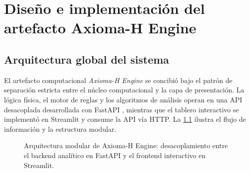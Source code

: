 \chapter{Dise\~no e implementaci\'on del artefacto Axioma-H Engine}
\label{cap:diseno_artefacto}

\section{Arquitectura global del sistema}
El artefacto computacional \emph{Axioma-H Engine} \parencite[v.~0.5.0]{axioma2026engine} se concibi\'o bajo el patr\'on de separaci\'on estricta entre el n\'ucleo computacional y la capa de presentaci\'on. La l\'ogica f\'isica, el motor de reglas y los algoritmos de an\'alisis operan en una API desacoplada desarrollada con FastAPI \parencite{fastapi}, mientras que el tablero interactivo se implement\'o en Streamlit \parencite{streamlit} y consume la API v\'ia HTTP. La \cref{fig:arquitectura} ilustra el flujo de informaci\'on y la estructura modular.

\begin{figure}[htbp]
\centering

\caption{Arquitectura modular de Axioma-H Engine: desacoplamiento entre el backend anal\'itico en FastAPI y el frontend interactivo en Streamlit.}
\label{fig:arquitectura}
\end{figure}

